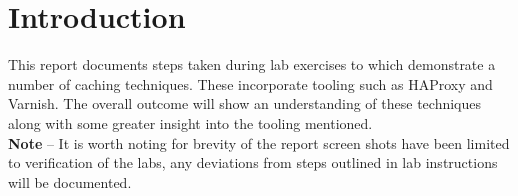 \section{Introduction}
This report documents steps taken during lab exercises to which demonstrate a number of caching techniques. These incorporate tooling such as HAProxy and Varnish. The overall outcome will show an understanding of these techniques along with some greater insight into the tooling mentioned.
\\\textbf{Note} -- It is worth noting for brevity of the report screen shots have been limited to verification of the labs, any deviations from steps outlined in lab instructions will be documented. 